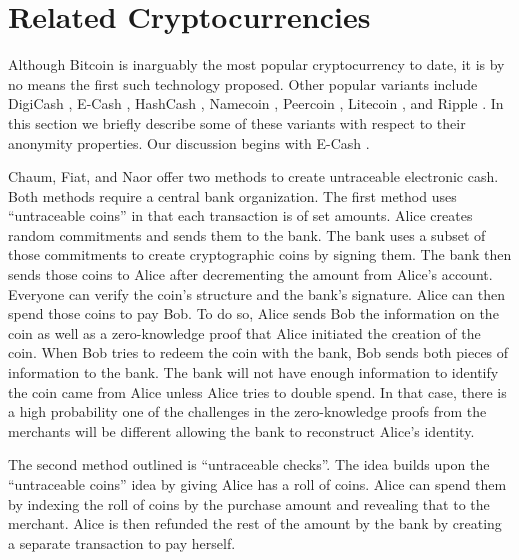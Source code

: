 \section{Related Cryptocurrencies} \label{sec:related}
Although Bitcoin is inarguably the most popular cryptocurrency to date, it is by no means the first such technology proposed. Other popular variants include DigiCash \cite{digicash}, E-Cash \cite{ecash}, HashCash \cite{hashcash}, Namecoin \cite{namecoin}, Peercoin \cite{peercoin}, Litecoin \cite{litecoin}, and Ripple \cite{ripple}. In this section we briefly describe some of these variants with respect to their anonymity properties. Our discussion begins with E-Cash \cite{ecash}.

Chaum, Fiat, and Naor offer two methods to create untraceable electronic cash. Both methods require a central bank organization.  The first method uses “untraceable coins” in that each transaction is of set amounts. Alice creates random commitments and sends them to the bank.  The bank uses a subset of those commitments to create cryptographic coins by signing them.  The bank then sends those coins to Alice after decrementing the amount from Alice’s account.  Everyone can verify the coin’s structure and the bank’s signature. Alice can then spend those coins to pay Bob.  To do so, Alice sends Bob the information on the coin as well as a zero-knowledge proof that Alice initiated the creation of the coin.  When Bob tries to redeem the coin with the bank, Bob sends both pieces of information to the bank.  The bank will not have enough information to identify the coin came from Alice unless Alice tries to double spend.  In that case, there is a high probability one of the challenges in the zero-knowledge proofs from the merchants will be different allowing the bank to reconstruct Alice’s identity.

The second method outlined is ``untraceable checks''.  The idea builds upon the “untraceable coins” idea by giving Alice has a roll of coins.  Alice can spend them by indexing the roll of coins by the purchase amount and revealing that to the merchant.  Alice is then refunded the rest of the amount by the bank by creating a separate transaction to pay herself.

